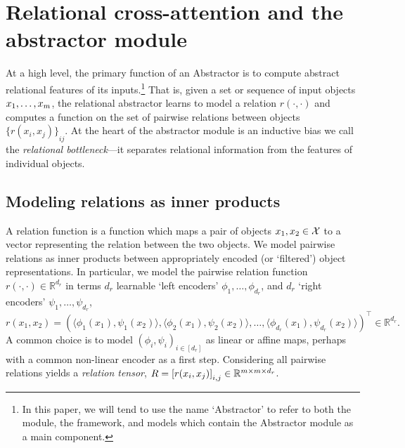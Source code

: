 \section{Relational cross-attention and the abstractor module}\label{sec:abstractor_module}

At a high level, the primary function of an Abstractor is to compute abstract relational features of its inputs.\footnote{In this paper, we will tend to use the name `Abstractor' to refer to both the module, the framework, and models which contain the Abstractor module as a main component.} That is, given a set or sequence of input objects $x_1, \ldots, x_m$, the relational abstractor learns to model a relation $r(\cdot, \cdot)$ and computes a function on the set of pairwise relations between objects ${\{ r(x_i, x_j) \}}_{ij}$. At the heart of the abstractor module is an inductive bias we call the \textit{relational bottleneck}---it separates relational information from the features of individual objects.


\subsection{Modeling relations as inner products}\label{ssec:relations_as_inner_prods}

A relation function is a function which maps a pair of objects $x_1, x_2 \in {\mathcal{X}}$ to a vector representing the relation between the two objects. We model pairwise relations as inner products between appropriately encoded (or `filtered') object representations. In particular, we model the pairwise relation function $r(\cdot, \cdot) \in \mathbb{R}^{d_r}$ in terms $d_r$ learnable `left encoders' $\phi_1, \ldots, \phi_{d_r}$, and $d_r$ `right encoders' $\psi_1, \ldots, \psi_{d_r}$,
\begin{equation}\label{eq:inner_prod_rel}
    r(x_1,x_2) = \left(\langle \phi_1(x_1), \psi_1(x_2) \rangle, \langle \phi_2(x_1), \psi_2(x_2) \rangle, \ldots, \langle \phi_{d_r}(x_1), \psi_{d_r}(x_2) \rangle \right)^\top \in \mathbb{R}^{d_r}.
\end{equation}
A common choice is to model $(\phi_i, \psi_i)_{i\in [d_r]}$ as linear or affine maps, perhaps with a common non-linear encoder as a first step. Considering all pairwise relations yields a \textit{relation tensor}, $R = \left[r(x_i, x_j)\right]_{i,j} \in \mathbb{R}^{m \times m \times d_r}$.


